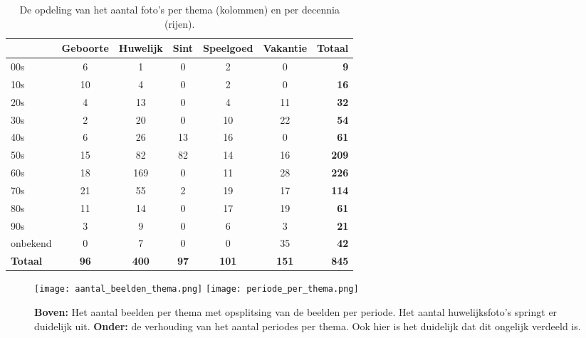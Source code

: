 \begin{table}
	\centering
	\renewcommand\arraystretch{1.2}
	\begin{tabular}{l|ccccc|r}
		\toprule
		& Geboorte & Huwelijk & Sint & Speelgoed & Vakantie & Totaal \\
		\midrule
		00s & 6 & 1 & 0 &2 & 0 & \textbf{9} \\
		10s & 10 & 4 & 0 & 2 & 0 & \textbf{16} \\
		20s & 4 & 13 & 0 & 4 & 11 & \textbf{32} \\
		30s & 2 & 20 & 0 & 10 & 22 & \textbf{54} \\
		40s & 6 & 26 & 13 & 16 & 0 & \textbf{61} \\
		50s & 15 & 82 & 82 & 14 & 16 & \textbf{209} \\
		60s & 18 & 169 & 0 & 11 & 28 & \textbf{226} \\
		70s & 21 & 55 & 2 & 19 & 17 & \textbf{114} \\
		80s & 11 & 14 & 0 & 17 & 19 & \textbf{61} \\
		90s & 3 & 9 & 0 & 6 & 3 & \textbf{21} \\
		onbekend & 0 & 7 & 0 & 0 & 35 & \textbf{42} \\
		\midrule
		\textbf{Totaal} & \textbf{96} & \textbf{400} & \textbf{97} & \textbf{101} & \textbf{151} & \textbf{845} \\
		\bottomrule
	\end{tabular}
	\caption[opdeling van het aantal foto’s per thema en decennia]{De opdeling van het aantal foto’s per thema (kolommen) en per decennia (rijen).}
	\label{tab:analyse-dataset}
\end{table}

\begin{figure}
	\centering
	\texttt{[image: aantal\_beelden\_thema.png]}\hfill
	\texttt{[image: periode\_per\_thema.png]}\hfill
	\caption[Staafdiagrammen met het aantal beelden per thema en de verhouding van het aantal periodes per thema]{\textbf{Boven:} Het aantal beelden per thema met opsplitsing van de beelden per periode. Het aantal huwelijksfoto's springt er duidelijk uit. \textbf{Onder:} de verhouding van het aantal periodes per thema. Ook hier is het duidelijk dat dit ongelijk verdeeld is.}
	\label{fig:verhouding-beelden-thema}
\end{figure}

